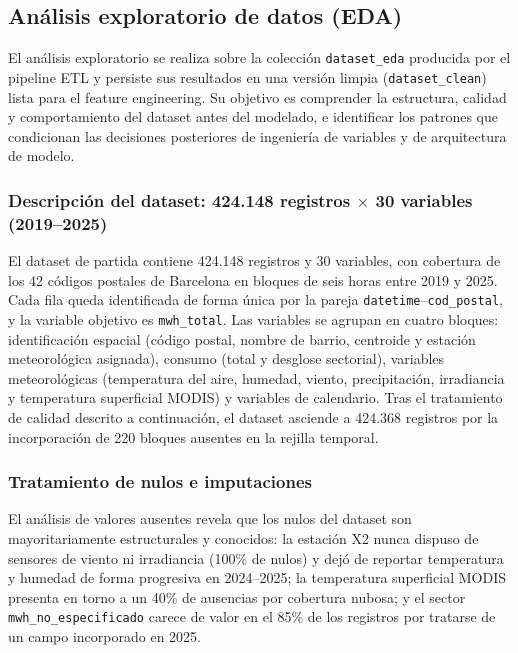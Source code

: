 \documentclass[12pt, a4paper]{article}
\begin{document}
\subsection{Análisis exploratorio de datos (EDA)}

El análisis exploratorio se realiza sobre la colección \texttt{dataset\_eda} producida por el pipeline ETL y persiste sus resultados en una versión limpia (\texttt{dataset\_clean}) lista para el feature engineering. Su objetivo es comprender la estructura, calidad y comportamiento del dataset antes del modelado, e identificar los patrones que condicionan las decisiones posteriores de ingeniería de variables y de arquitectura de modelo.

\subsubsection{Descripción del dataset: 424.148 registros $\times$ 30 variables (2019--2025)}

El dataset de partida contiene 424.148 registros y 30 variables, con cobertura de los 42 códigos postales de Barcelona en bloques de seis horas entre 2019 y 2025. Cada fila queda identificada de forma única por la pareja \texttt{datetime}--\texttt{cod\_postal}, y la variable objetivo es \texttt{mwh\_total}. Las variables se agrupan en cuatro bloques: identificación espacial (código postal, nombre de barrio, centroide y estación meteorológica asignada), consumo (total y desglose sectorial), variables meteorológicas (temperatura del aire, humedad, viento, precipitación, irradiancia y temperatura superficial MODIS) y variables de calendario. Tras el tratamiento de calidad descrito a continuación, el dataset asciende a 424.368 registros por la incorporación de 220 bloques ausentes en la rejilla temporal.

\subsubsection{Tratamiento de nulos e imputaciones}

El análisis de valores ausentes revela que los nulos del dataset son mayoritariamente estructurales y conocidos: la estación X2 nunca dispuso de sensores de viento ni irradiancia (100\% de nulos) y dejó de reportar temperatura y humedad de forma progresiva en 2024--2025; la temperatura superficial MODIS presenta en torno a un 40\% de ausencias por cobertura nubosa; y el sector \texttt{mwh\_no\_especificado} carece de valor en el 85\% de los registros por tratarse de un campo incorporado en 2025.
\end{document}

